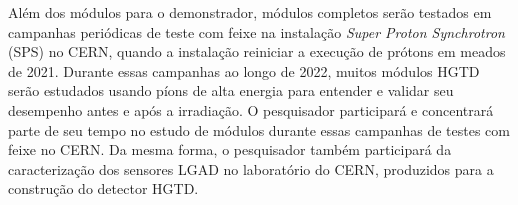 Além dos módulos para o demonstrador, módulos completos serão testados em campanhas periódicas de teste com feixe na instalação \textit{Super Proton Synchrotron} (SPS) no CERN, quando a instalação reiniciar a execução de prótons em meados de 2021. Durante essas campanhas ao longo de 2022, muitos módulos HGTD serão estudados usando píons de alta energia para entender e validar seu desempenho antes e após a irradiação. O pesquisador participará e concentrará parte de seu tempo no estudo de módulos durante essas campanhas de testes com feixe no CERN. Da mesma forma, o pesquisador também participará da caracterização dos sensores LGAD no laboratório do CERN, produzidos para a construção do detector HGTD. 




